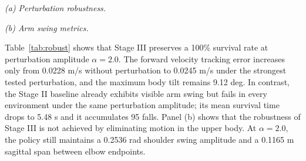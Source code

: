 \documentclass{article}
\begin{document}
\begin{table}[t]
  \caption{Finite horizon evaluation and upper body motion metrics.}
  \label{tab:robust}
  \centering
  \scriptsize
  \textit{(a) Perturbation robustness.}\\[2pt]
  \vspace{4pt}

  \textit{(b) Arm swing metrics.}\\[2pt]
\end{table}

Table~\ref{tab:robust} shows that Stage III preserves a 100\% survival rate at perturbation amplitude $\alpha=2.0$. The forward velocity tracking error increases only from 0.0228 m/s without perturbation to 0.0245 m/s under the strongest tested perturbation, and the maximum body tilt remains 9.12 deg. In contrast, the Stage II baseline already exhibits visible arm swing but fails in every environment under the same perturbation amplitude; its mean survival time drops to 5.48 s and it accumulates 95 falls. Panel (b) shows that the robustness of Stage III is not achieved by eliminating motion in the upper body. At $\alpha=2.0$, the policy still maintains a 0.2536 rad shoulder swing amplitude and a 0.1165 m sagittal span between elbow endpoints.
\end{document}
